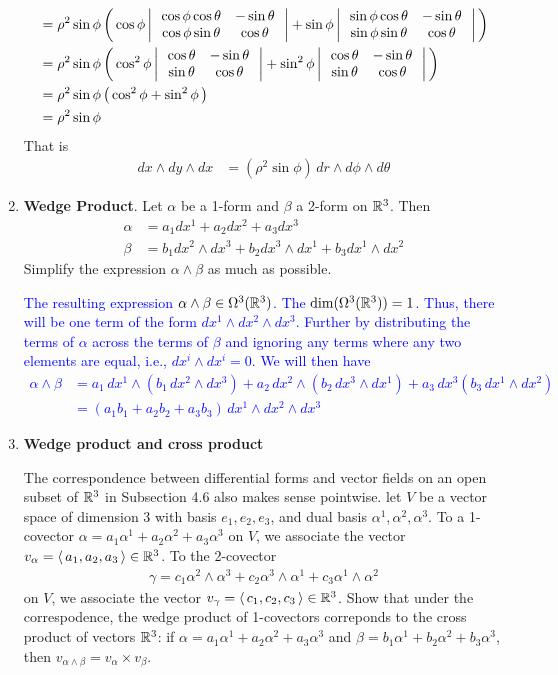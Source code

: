 \documentclass[10pt,a4paper]{report}
\newcommand{\BLUE}[1]{\textcolor{blue}{#1}}
\begin{document}
\begin{enumerate}[label=4.\arabic*]
{\begin{align*}
	&= \rho^2\sin\phi \left (\, \cos\phi\left |\,  \begin{array}{c c} \cos\phi\cos\theta&-\sin\theta \\ \cos\phi\sin\theta & \cos\theta \end{array}  \,\right | +\sin\phi\left |\,  \begin{array}{c c} \sin\phi\cos\theta&-\sin\theta \\ \sin\phi\sin\theta & \cos\theta \end{array}  \,\right |  \,\right )\\
	&= \rho^2\sin\phi \left (\, \cos^2\phi\left |\,  \begin{array}{c c} \cos\theta&-\sin\theta \\ \sin\theta & \cos\theta \end{array}  \,\right | +\sin^2\phi\left |\,  \begin{array}{c c} \cos\theta&-\sin\theta \\ \sin\theta & \cos\theta \end{array}  \,\right |  \,\right )\\
	&= \rho^2\sin\phi \left (\, \cos^2\phi +\sin^2\phi \,\right ) \\
	&= \rho^2\sin\phi
\end{align*}That is
\begin{align*}
	dx\wedge dy\wedge dx &= (\rho^2\sin\phi) \,dr\wedge d\phi \wedge d\theta
\end{align*}
}

\item \textbf{Wedge Product}. Let $\alpha$ be a 1-form and $\beta$ a 2-form on $\mathbb{R}^3$.  Then 
\begin{align*}
	\alpha &= a_1dx^1+a_2dx^2+a_3dx^3 \\
	\beta &= b_1 dx^2\wedge dx^3 + b_2 dx^3 \wedge dx^1 + b_3dx^1\wedge dx^2
\end{align*}Simplify the expression $\alpha \wedge \beta$ as much as possible.

\BLUE{The resulting expression $\alpha\wedge\beta\in \Omega^3(\mathbb{R}^3)$.  The $\dim(\Omega^3(\mathbb{R}^3)) = 1$.  Thus, there will be one term of the form $dx^1\wedge dx^2\wedge dx^3$.  Further by distributing the terms of $\alpha$ across the terms of $\beta$ and ignoring any terms where any two elements are equal, i.e., $dx^i\wedge dx^i =0$.  We will then have
\begin{align*}
	\alpha \wedge \beta &= a_1\,dx^1\wedge(b_1\,dx^2\wedge dx^3)+a_2\,dx^2\wedge(b_2\,dx^3\wedge dx^1)+a_3\,dx^3(b_3\,dx^1\wedge dx^2) \\
	&= (a_1b_1+a_2b_2+a_3b_3)\, dx^1\wedge dx^2\wedge dx^3
\end{align*}
}

\item \textbf{Wedge product and cross product}

The correspondence between differential forms and vector fields on an open subset of $\mathbb{R}^3$ in Subsection 4.6 also makes sense pointwise.  let $V$ be a vector space of dimension 3 with basis $e_1, e_2, e_3$,  and dual basis $\alpha^1, \alpha^2, \alpha^3$.  To a 1-covector $\alpha=a_1\alpha^1+a_2\alpha^2+a_3\alpha^3$ on $V$, we associate the vector $v_\alpha = \left \langle\, a_1,a_2,a_3 \,\right \rangle \in \mathbb{R}^3$.  To the 2-covector
\begin{align*}
	\gamma = c_1 \alpha^2\wedge \alpha^3 + c_2\alpha^3\wedge\alpha^1 + c_3\alpha^1\wedge\alpha^2
\end{align*}on $V$, we associate the vector $v_\gamma=\left \langle\, c_1,c_2,c_3 \,\right \rangle\in \mathbb{R}^3$.  Show that under the correspodence, the wedge product of 1-covectors correponds to the cross product of vectors $\mathbb{R}^3$:  if $\alpha = a_1\alpha^1+a_2\alpha^2+a_3\alpha^3$ and $\beta = b_1\alpha^1+b_2\alpha^2+b_3\alpha^3$, then $v_{\alpha\wedge\beta}= v_\alpha \times v_\beta$.


\end{enumerate}
\end{document}
